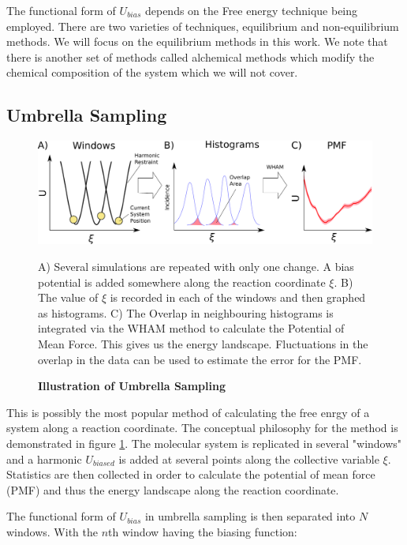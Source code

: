 The functional form of $U_{bias}$ depends on the Free energy technique being employed. There are two varieties of techniques, equilibrium and non-equilibrium methods. We will focus on the equilibrium methods in this work. We note that there is another set of methods called alchemical methods which modify the chemical composition of the system which we will not cover.

\subsection{Umbrella Sampling}
\begin{figure}
	\begin{center}
		\includegraphics[width=\textwidth]{figures/umbrella_sampling.png.pdf}
	\end{center}
	\captionsetup{singlelinecheck = false, justification=raggedright}
	\caption[Illustration of Umbrella Sampling] {\textbf{Illustration of Umbrella Sampling}}{A) Several simulations are repeated with only one change. A bias  potential is added somewhere along the reaction coordinate $\xi$. B) The value of $\xi$ is recorded in each of the windows and then graphed as histograms. C) The Overlap in neighbouring histograms is integrated via the WHAM method to calculate the Potential of Mean Force. This gives us the energy landscape. Fluctuations in the overlap in the data can be used to estimate the error for the PMF. }
	\label{umbrella_sampling_illustration}
\end{figure}

This is possibly the most popular method of calculating the free enrgy of a system along a reaction coordinate. The conceptual philosophy for the method is demonstrated in figure \ref{umbrella_sampling_illustration}. The molecular system is replicated in several "windows" and a harmonic $U_{biased}$ is added at several points along the collective variable $\xi$. Statistics are then collected in order to calculate the potential of mean force (PMF) and thus the energy landscape along the reaction coordinate.  

The functional form of $U_{bias}$ in umbrella sampling is then separated into $N$ windows. With the $n$th window having the biasing function:

